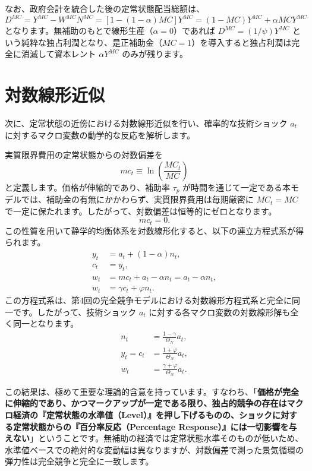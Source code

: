 \documentclass[
  japanese,
  lualatex,
  ja=standard,
  12pt,
  a4paper]{ltjsarticle}
\begin{document}
なお、政府会計を統合した後の定常状態配当総額は、 \[
D^{MC} = Y^{MC} - W^{MC} N^{MC} = \left[ 1 - (1-\alpha)MC \right] Y^{MC} = (1 - MC) Y^{MC} + \alpha MC Y^{MC}
\] となります。無補助のもとで線形生産（\(\alpha=0\)）であれば
\(D^{MC} = (1/\psi)Y^{MC}\)
という純粋な独占利潤となり、是正補助金（\(MC=1\)）を導入すると独占利潤は完全に消滅して資本レント
\(\alpha Y^{MC}\) のみが残ります。

\section{対数線形近似}\label{ux5bfeux6570ux7ddaux5f62ux8fd1ux4f3c}

次に、定常状態の近傍における対数線形近似を行い、確率的な技術ショック
\(a_t\) に対するマクロ変数の動学的な反応を解析します。

実質限界費用の定常状態からの対数偏差を \[
mc_t \equiv \ln\left( \frac{MC_t}{MC} \right)
\] と定義します。価格が伸縮的であり、補助率 \(\tau_p\)
が時間を通じて一定である本モデルでは、補助金の有無にかかわらず、実質限界費用は毎期厳密に
\(MC_t = MC\)
で一定に保たれます。したがって、対数偏差は恒等的にゼロとなります。 \[
mc_t = 0.
\]
この性質を用いて静学的均衡体系を対数線形化すると、以下の連立方程式系が得られます。
\[
\begin{aligned}
y_t &= a_t + (1-\alpha) n_t,\\
c_t &= y_t,\\
w_t &= mc_t + a_t - \alpha n_t = a_t - \alpha n_t,\\
w_t &= \gamma c_t + \varphi n_t.
\end{aligned}
\]
この方程式系は、第4回の完全競争モデルにおける対数線形方程式系と完全に同一です。したがって、技術ショック
\(a_t\) に対する各マクロ変数の対数線形解も全く同一となります。 \[
\begin{aligned}
n_t &= \frac{1-\gamma}{\Theta_N} a_t,\\
y_t = c_t &= \frac{1+\varphi}{\Theta_N} a_t,\\
w_t &= \frac{\gamma+\varphi}{\Theta_N} a_t.
\end{aligned}
\]

この結果は、極めて重要な理論的含意を持っています。すなわち、「\textbf{価格が完全に伸縮的であり、かつマークアップが一定である限り、独占的競争の存在はマクロ経済の『定常状態の水準値（Level）』を押し下げるものの、ショックに対する定常状態からの『百分率反応（Percentage
Response）』には一切影響を与えない}」ということです。無補助の経済では定常状態水準そのものが低いため、水準値ベースでの絶対的な変動幅は異なりますが、対数偏差で測った景気循環の弾力性は完全競争と完全に一致します。
\end{document}
